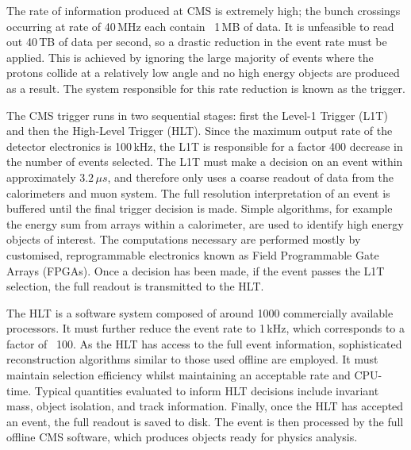 The rate of information produced at CMS is extremely high; the bunch crossings occurring at rate of 40\,MHz each contain ~1\,MB of data.
It is unfeasible to read out 40\,TB of data per second, so a drastic reduction in the event rate must be applied.
This is achieved by ignoring the large majority of events where the protons collide at a relatively low angle and no high energy objects are produced as a result.
The system responsible for this rate reduction is known as the trigger.

The CMS trigger runs in two sequential stages: first the Level-1 Trigger (L1T) and then the High-Level Trigger (HLT).
Since the maximum output rate of the detector electronics is 100\,kHz, the L1T is responsible for a factor 400 decrease in the number of events selected.
The L1T must make a decision on an event within approximately $3.2\,\mu s$, and therefore only uses a coarse readout of data from the calorimeters and muon system.
The full resolution interpretation of an event is buffered until the final trigger decision is made. %
Simple algorithms, for example the energy sum from arrays within a calorimeter, are used to identify high energy objects of interest.
The computations necessary are performed mostly by customised, reprogrammable electronics known as Field Programmable Gate Arrays (FPGAs).
Once a decision has been made, if the event passes the L1T selection, the full readout is transmitted to the HLT.

The HLT is a software system composed of around 1000 commercially available processors.
It must further reduce the event rate to 1\,kHz, which corresponds to a factor of ~100.
As the HLT has access to the full event information, sophisticated reconstruction algorithms similar to those used offline are employed. 
It must maintain selection efficiency whilst maintaining an acceptable rate and CPU-time. 
Typical quantities evaluated to inform HLT decisions include invariant mass, object isolation, and track information.
Finally, once the HLT has accepted an event, the full readout is saved to disk.
The event is then processed by the full offline CMS software, which produces objects ready for physics analysis.
